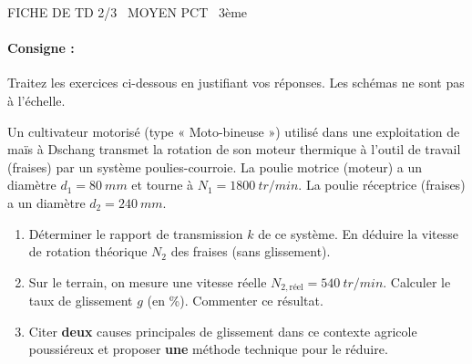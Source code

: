\documentclass[11pt]{article}
\begin{document}
\begin{tcolorbox}[enhanced,colback=popink,colframe=popink,arc=10pt,boxrule=0pt,left=12pt,right=12pt,top=9pt,bottom=9pt]
{\color{white}\popxbold\small FICHE DE TD 2/3 \textbullet\ MOYEN \hfill PCT \textbullet\ 3ème\par}
\end{tcolorbox}
\vspace{4pt}
\paragraph{Consigne :} Traitez les exercices ci-dessous en justifiant vos réponses. Les schémas ne sont pas à l'échelle.

\begin{exercice}
Un cultivateur motorisé (type « Moto-bineuse ») utilisé dans une exploitation de maïs à Dschang transmet la rotation de son moteur thermique à l'outil de travail (fraises) par un système poulies-courroie. La poulie motrice (moteur) a un diamètre $d_1 = \SI{80}{mm}$ et tourne à $N_1 = \SI{1800}{tr/min}$. La poulie réceptrice (fraises) a un diamètre $d_2 = \SI{240}{mm}$.
\begin{enumerate}
    \item Déterminer le rapport de transmission $k$ de ce système. En déduire la vitesse de rotation théorique $N_2$ des fraises (sans glissement).
    \item Sur le terrain, on mesure une vitesse réelle $N_{2,\text{réel}} = \SI{540}{tr/min}$. Calculer le taux de glissement $g$ (en \%). Commenter ce résultat.
    \item Citer \textbf{deux} causes principales de glissement dans ce contexte agricole poussiéreux et proposer \textbf{une} méthode technique pour le réduire.
\end{enumerate}
\end{exercice}
\end{document}
